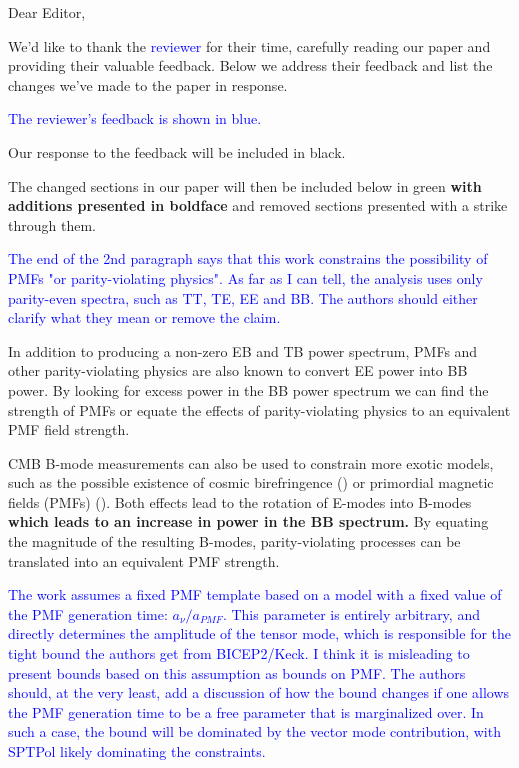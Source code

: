 \documentclass{article}
\newcommand{\added}[1]{\textbf{#1}}
\newcommand{\reviewer}[1]{\textcolor{Blue}{#1}}
\newcommand{\diff}[1]{\textcolor{PineGreen}{#1}}
\begin{document}
Dear Editor,

We'd like to thank the \reviewer{reviewer} for their time, carefully reading our paper and providing their valuable feedback. Below we address their feedback and list the changes we've made to the paper in response.


\reviewer{The reviewer's feedback is shown in blue.}

Our response to the feedback will be included in black. 

\diff{The changed sections in our paper will then be included below in green \added{with additions presented in boldface} and removed sections presented with a strike through them.}


\reviewer{The end of the 2nd paragraph says that this work constrains the possibility of PMFs "or parity-violating physics". As far as I can tell, the analysis uses only parity-even spectra, such as TT, TE, EE and BB. The authors should either clarify what they mean or remove the claim.}

In addition to producing a non-zero EB and TB power spectrum, PMFs and other parity-violating physics are also known to convert EE power into BB power. By looking for excess power in the BB power spectrum we can find the strength of PMFs or equate the effects of parity-violating physics to an equivalent PMF field strength.

\diff{CMB B-mode measurements can also be used to constrain more exotic models, such as the possible existence of cosmic birefringence (\citep{carroll98,lue99}) or primordial magnetic fields (PMFs) (\citep{kosowsky96, seshadri01}).  
Both effects lead to the rotation of E-modes into B-modes \textbf{which leads to an increase in power in the BB spectrum.}
By equating the magnitude of the resulting B-modes, parity-violating processes can be translated into an equivalent PMF strength.}


\reviewer{The work assumes a fixed PMF template based on a model with a fixed value of the PMF generation time: $a_{\nu}/a_{PMF}$. This parameter is entirely arbitrary, and directly determines the amplitude of the tensor mode, which is responsible for the tight bound the authors get from BICEP2/Keck. I think it is misleading to present bounds based on this assumption as bounds on PMF. The authors should, at the very least, add a discussion of how the bound changes if one allows the PMF generation time to be a free parameter that is marginalized over. In such a case, the bound will be dominated by the vector mode contribution, with SPTPol likely dominating the constraints.}
\end{document}
